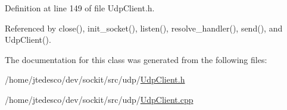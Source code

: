 Definition at line 149 of file UdpClient.h.



Referenced by close(), init\_\-socket(), listen(), resolve\_\-handler(), send(), and UdpClient().



The documentation for this class was generated from the following files:\begin{DoxyCompactItemize}
\item 
/home/jtedesco/dev/sockit/src/udp/\hyperlink{UdpClient_8h}{UdpClient.h}\item 
/home/jtedesco/dev/sockit/src/udp/\hyperlink{UdpClient_8cpp}{UdpClient.cpp}\end{DoxyCompactItemize}
